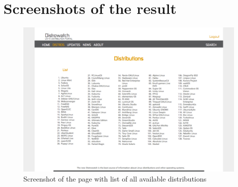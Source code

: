 \documentclass[thesis=B,english]{FITthesis}[2013/04/26]
\begin{document}




\appendix

\printglossaries
\glsaddall

\chapter{Screenshots of the result}

\begin{center}
\begin{figure}[overhang]
	\advance\leftskip-0.75cm
	\includegraphics[width=430pt]{images/screen_distros.pdf}
	\caption{Screenshot of the page with list of all available distributions}
	\label{fig: tndw-screens}
\end{figure}


\end{center}
\end{document}
